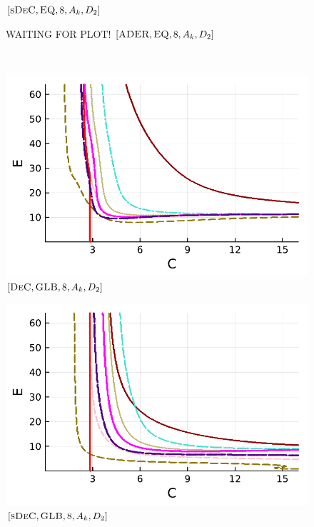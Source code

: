 \begin{figure}[!h]
\begin{minipage}[t]{0.32\textwidth}
		\centering
		$[\textsc{sDeC},\textsc{EQ},8, A_k,D_2]$
	\end{minipage}
	\begin{minipage}[t]{0.32\textwidth}
		WAITING FOR PLOT!
		\centering
		$[\textsc{ADER},\textsc{EQ},8, A_k,D_2]$
	\end{minipage}\\
	\begin{minipage}[t]{0.32\textwidth}
		\includegraphics[width=\textwidth]{pdf/pdepics/diff/IMEXDeC_gaussLobatto_adv_ord_1-8.pdf}
		\centering
		$[\textsc{DeC},\textsc{GLB},8, A_k,D_2]$
	\end{minipage}
	\begin{minipage}[t]{0.32\textwidth}
		\includegraphics[width=\textwidth]{pdf/pdepics/diff/IMEXDeC_subtimesteps_gaussLobatto_adv_ord_1-8.pdf}
		\centering
		$[\textsc{sDeC},\textsc{GLB},8, A_k,D_2]$
	\end{minipage}

\end{figure}
